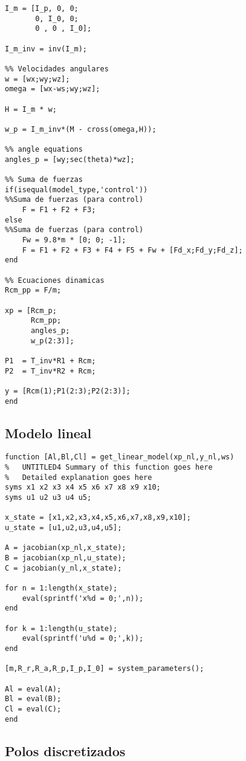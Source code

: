 \begin{lstlisting}[frame=single]
%%Matriz de inercia ???
I_m = [I_p, 0, 0;
       0, I_0, 0;
       0 , 0 , I_0];

I_m_inv = inv(I_m);

%% Velocidades angulares
w = [wx;wy;wz];
omega = [wx-ws;wy;wz];

H = I_m * w;

w_p = I_m_inv*(M - cross(omega,H));

%% angle equations
angles_p = [wy;sec(theta)*wz];

%% Suma de fuerzas
if(isequal(model_type,'control'))
%%Suma de fuerzas (para control)
    F = F1 + F2 + F3;
else
%%Suma de fuerzas (para control)
    Fw = 9.8*m * [0; 0; -1];
    F = F1 + F2 + F3 + F4 + F5 + Fw + [Fd_x;Fd_y;Fd_z];
end

%% Ecuaciones dinamicas
Rcm_pp = F/m;

xp = [Rcm_p;
      Rcm_pp;
      angles_p;
      w_p(2:3)];

P1  = T_inv*R1 + Rcm;
P2  = T_inv*R2 + Rcm;

y = [Rcm(1);P1(2:3);P2(2:3)];
end
\end{lstlisting}
 
\subsection{Modelo lineal}

\begin{lstlisting}[frame=single]
function [Al,Bl,Cl] = get_linear_model(xp_nl,y_nl,ws)
%	UNTITLED4 Summary of this function goes here
%   Detailed explanation goes here
syms x1 x2 x3 x4 x5 x6 x7 x8 x9 x10;
syms u1 u2 u3 u4 u5;

x_state = [x1,x2,x3,x4,x5,x6,x7,x8,x9,x10];
u_state = [u1,u2,u3,u4,u5];

A = jacobian(xp_nl,x_state);
B = jacobian(xp_nl,u_state);
C = jacobian(y_nl,x_state);

for n = 1:length(x_state);
    eval(sprintf('x%d = 0;',n));
end

for k = 1:length(u_state);
    eval(sprintf('u%d = 0;',k));
end

[m,R_r,R_a,R_p,I_p,I_0] = system_parameters();

Al = eval(A);
Bl = eval(B);
Cl = eval(C);
end

\end{lstlisting}
 
\subsection{Polos discretizados}

